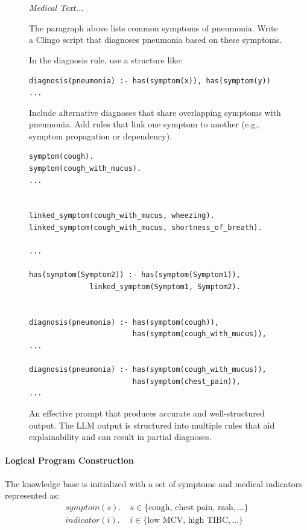 \documentclass[11pt,leqno]{amsart}
\newcommand{\src}[1]{\texttt{#1}}
\newenvironment{commandline}{
	\medskip
	\begin{mdframed}[style=commandline]
}{
	\end{mdframed}
	\medskip
}
\newenvironment{prompt}[1][Prompt:]{ %
	\medskip
	\begin{mdframed}[style=warning]
		\noindent{\textbf{#1}}
}{
	\end{mdframed}
}
\begin{document}
\begin{figure}[!h]
\begin{prompt}
\textit{Medical Text...}

The paragraph above lists common symptoms of pneumonia.
Write a Clingo script that diagnoses pneumonia based on these symptoms.

In the diagnosis rule, use a structure like:

\src{diagnosis(pneumonia) :- has(symptom(x)), has(symptom(y)) ...}

Include alternative diagnoses that share overlapping symptoms with pneumonia.
Add rules that link one symptom to another (e.g., symptom propagation or dependency).

\end{prompt}


\begin{commandline}
\footnotesize
\begin{verbatim}
symptom(cough).
symptom(cough_with_mucus).
...


linked_symptom(cough_with_mucus, wheezing).
linked_symptom(cough_with_mucus, shortness_of_breath).

...

has(symptom(Symptom2)) :- has(symptom(Symptom1)), 
              linked_symptom(Symptom1, Symptom2).


diagnosis(pneumonia) :- has(symptom(cough)),
                        has(symptom(cough_with_mucus)),
...

diagnosis(pneumonia) :- has(symptom(cough_with_mucus)),
                        has(symptom(chest_pain)),
...
\end{verbatim}
\end{commandline}
\caption{An effective prompt that produces accurate and well-structured output.
	The LLM output is structured into multiple rules that aid explainability and can result in partial diagnoses.}
\label{fig:good-prompt}
\end{figure}

\paragraph{\textbf{Logical Program Construction}}

The knowledge base is initialized with a set of symptoms and medical indicators represented as:
\begin{align}
    symptom(s). & \; s \in \{ \text{cough, chest pain, rash}, \dots \} \\
    indicator(i). & \; i \in \{ \text{low MCV, high TIBC}, \dots \}
\end{align}
\end{document}
